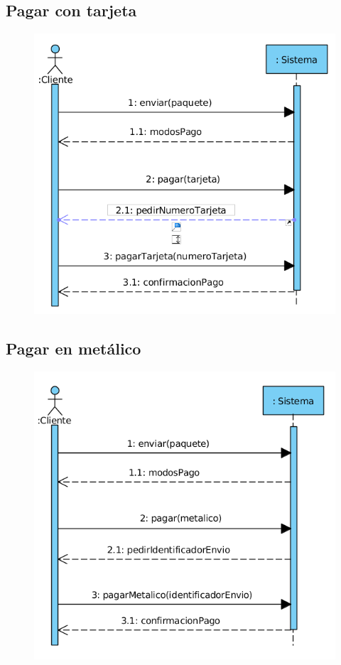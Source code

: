 \subsection{Pagar con tarjeta}
\begin{figure}[H]
	\centering
	\includegraphics[width=16cm]{43}
\end{figure}
\subsection{Pagar en metálico}
\begin{figure}[H]
	\centering
	\includegraphics[width=16cm]{44}
\end{figure}
